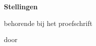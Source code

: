 \documentclass{dissertation-edit}
\begin{document}
\clearpage
{

\begin{center}

{\Large\titlefont\bfseries Stellingen}

\bigskip

behorende bij het proefschrift

\bigskip

{\makeatletter
\titlestyle\bfseries\large\@title
\makeatother}

{\makeatletter
\ifx\@subtitle\undefined\else
    \titlefont\titleshape\@subtitle
\fi
\makeatother}

\bigskip

door

\bigskip

\makeatletter
{\large\titlefont\bfseries\@firstname\ {\titleshape\@lastname}}
\makeatother

\end{center}

\bigskip
\bigskip

\begin{enumerate}


\end{enumerate}}
\end{document}
